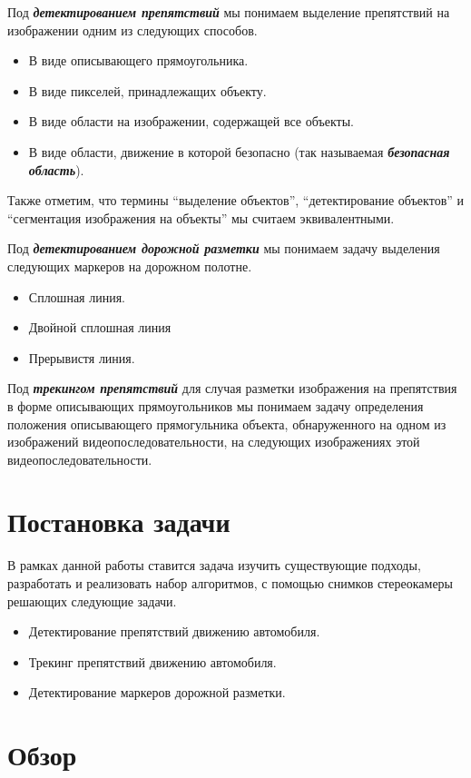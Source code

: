 \documentclass[aps,%
14pt,%
final,%
oneside,
onecolumn,%
musixtex, %
superscriptaddress,%
centertags]{extarticle} %
\begin{document}
Под \textit{\textbf{детектированием препятствий}} мы понимаем выделение препятствий на изображении одним из следующих способов.
\begin{itemize}
    \item В виде описывающего прямоугольника.
    \item В виде пикселей, принадлежащих объекту.
    \item В виде области на изображении, содержащей все объекты.
    \item В виде области, движение в которой безопасно (так называемая \textit{\textbf{безопасная область}}).
\end{itemize}
Также отметим, что термины ``выделение объектов'', ``детектирование объектов'' и ``сегментация изображения на объекты'' мы считаем эквивалентными.

Под \textit{\textbf{детектированием дорожной разметки}} мы понимаем задачу выделения следующих маркеров на дорожном полотне.
\begin{itemize}
    \item Сплошная линия.
    \item Двойной сплошная линия
    \item Прерывистя линия.
\end{itemize}

Под \textit{\textbf{трекингом препятствий}} для случая разметки изображения на препятствия в форме описывающих прямоугольников мы понимаем задачу определения положения описывающего прямогульника объекта, обнаруженного на одном из изображений видеопоследовательности, на следующих изображениях этой видеопоследовательности.

\section{Постановка задачи}

В рамках данной работы ставится задача изучить существующие подходы, разработать и реализовать набор алгоритмов, с помощью снимков стереокамеры  решающих следующие задачи.
\begin{itemize}
    \item Детектирование препятствий движению автомобиля.
    \item Трекинг препятствий движению автомобиля.
    \item Детектирование маркеров дорожной разметки.
\end{itemize} 

\section{Обзор}
\end{document}

